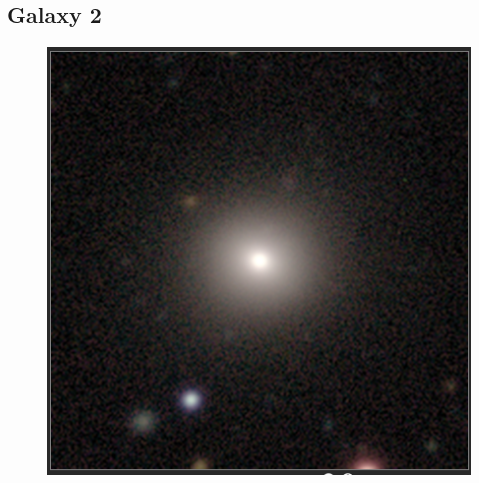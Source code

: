 \documentclass[11pt,letterpaper]{article}
\begin{document}
\subsection*{Galaxy 2}
\begin{figure}[!htbp]
    \centering
    \includegraphics[width=\linewidth]{gal2.png}
\end{figure}

\newpage
\end{document}
